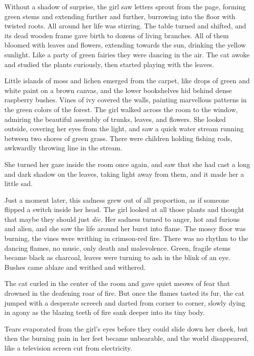 \documentclass[openany, oneside]{book}
\begin{document}
Without a shadow of surprise, the girl saw letters sprout from the page, forming green stems and extending further and further, burrowing into the floor with twisted roots.
All around her life was stirring.
The table turned and shifted, and its dead wooden frame gave birth to dozens of living branches.
All of them bloomed with leaves and flowers, extending towards the sun, drinking the yellow sunlight.
Like a party of green fairies they were dancing in the air.
The cat awoke and studied the plants curiously, then started playing with the leaves.

Little islands of moss and lichen emerged from the carpet, like drops of green and white paint on a brown canvas, and the lower bookshelves hid behind dense raspberry bushes.
Vines of ivy covered the walls, painting marvellous patterns in the green colors of the forest. The girl walked across the room to the window, admiring the beautiful assembly of trunks, leaves, and flowers.
She looked outside, covering her eyes from the light, and saw a quick water stream running between two shores of green grass. There were children holding fishing rods, awkwardly throwing line in the stream.

She turned her gaze inside the room once again, and saw that she had cast a long and dark shadow on the leaves, taking light away from them, and it made her a little sad.

Just a moment later, this sadness grew out of all proportion, as if someone flipped a switch inside her head.
The girl looked at all those plants and thought that maybe they should just \emph{die.}
Her sadness turned to anger, hot and furious and alien, and she saw the life around her burst into flame.
The mossy floor was burning, the vines were writhing in crimson-red fire.
There was no rhythm to the dancing flames, no music, only death and malevolence.
Green, fragile stems became black as charcoal, leaves were turning to ash in the blink of an eye.
Bushes came ablaze and writhed and withered.

The cat curled in the center of the room and gave quiet meows of fear that drowned in the deafening roar of fire.
But once the flames tasted its fur, the cat jumped with a desperate screech and darted from corner to corner, slowly dying in agony as the blazing teeth of fire sank deeper into its tiny body.

Tears evaporated from the girl's eyes before they could slide down her cheek, but then the burning pain in her feet became unbearable, and the world disappeared, like a television screen cut from electricity.
\end{document}
